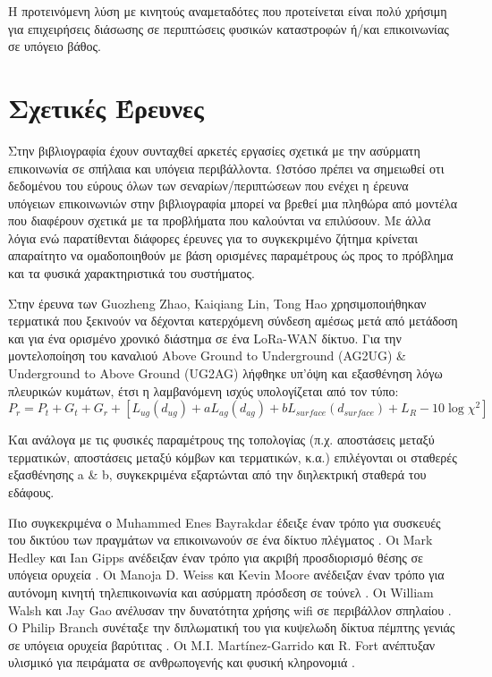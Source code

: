 \documentclass[12pt]{article}
\begin{document}
\begin{multicols*}{2}
        Η προτεινόμενη λύση με κινητούς αναμεταδότες που προτείνεται είναι πολύ χρήσιμη
        για επιχειρήσεις διάσωσης σε περιπτώσεις φυσικών καταστροφών ή/και επικοινωνίας σε
        υπόγειο βάθος.

    \section{\normalsize \textsf{Σχετικές Έρευνες}} Στην βιβλιογραφία έχουν συνταχθεί
        αρκετές εργασίες σχετικά με την ασύρματη επικοινωνία σε σπήλαια και υπόγεια
        περιβάλλοντα. Ωστόσο πρέπει να σημειωθεί οτι δεδομένου του εύρους όλων των 
        σεναρίων/περιπτώσεων που ενέχει η έρευνα υπόγειων επικοινωνιών στην βιβλιογραφία
        μπορεί να βρεθεί μια πληθώρα από μοντέλα που διαφέρουν σχετικά με τα προβλήματα που
        καλούνται να επιλύσουν. Με άλλα λόγια ενώ παρατίθενται διάφορες έρευνες για το 
        συγκεκριμένο ζήτημα κρίνεται απαραίτητο να ομαδοποιηθούν με βάση ορισμένες παραμέτρους
        ώς προς το πρόβλημα και τα φυσικά χαρακτηριστικά του συστήματος.
        
        Στην έρευνα των Guozheng Zhao, Kaiqiang Lin, Tong Hao \cite*{zhao_feasibility_2023}
        χρησιμοποιήθηκαν τερματικά που ξεκινούν να δέχονται κατερχόμενη σύνδεση αμέσως μετά 
        από μετάδοση και για ένα ορισμένο χρονικό διάστημα σε ένα LoRa-WAN δίκτυο.
        Για την μοντελοποίηση του καναλιού Above Ground to Underground (AG2UG) \& 
        Underground to Above Ground (UG2AG) λήφθηκε υπ'όψη και εξασθένηση λόγω πλευρικών
        κυμάτων, έτσι η λαμβανόμενη ισχύς υπολογίζεται από τον τύπο:\\
        \begin{equation} \label{eq:1}
            P_r = P_t + G_t + G_r + [L_{ug}(d_{ug}) + aL_{ag}(d_{ag}) + bL_{surface}(d_{surface}) + L_R - 10\log\chi^2]    
        \end{equation} 
        
        Και ανάλογα με τις φυσικές παραμέτρους της τοπολογίας (π.χ. αποστάσεις μεταξύ
        τερματικών, αποστάσεις μεταξύ κόμβων και τερματικών, κ.α.) επιλέγονται οι 
        σταθερές εξασθένησης a \& b, συγκεκριμένα εξαρτώνται από την διηλεκτρική 
        σταθερά του εδάφους.


        Πιο συγκεκριμένα ο Muhammed Enes Bayrakdar έδειξε έναν τρόπο για
        συσκευές του δικτύου των πραγμάτων να επικοινωνούν σε ένα δίκτυο πλέγματος
        \cite{bayrakdar_rule_2019}. Οι Mark Hedley και Ian Gipps ανέδειξαν έναν τρόπο για
        ακριβή προσδιορισμό θέσης σε υπόγεια ορυχεία \cite{hedley_accurate_2013}. Οι
        Manoja D. Weiss και Kevin Moore ανέδειξαν έναν τρόπο για αυτόνομη κινητή
        τηλεπικοινωνία και ασύρματη πρόσδεση σε τούνελ \cite{weiss_autonomous_2009}. Οι
        William Walsh και Jay Gao ανέλυσαν την δυνατότητα χρήσης wifi σε περιβάλλον
        σπηλαίου \cite{walsh_communications_2018}. Ο Philip Branch συνέταξε την
        διπλωματική του για κυψελωδη δίκτυα πέμπτης γενιάς σε υπόγεια ορυχεία βαρύτιτας
        \cite{branch_fifth_2021}. Οι M.I. Martínez-Garrido και R. Fort ανέπτυξαν υλισμικό
        για πειράματα σε ανθρωπογενής και φυσική κληρονομιά
        \cite{martinez-garrido_experimental_2016}.


\end{multicols*}
\end{document}

